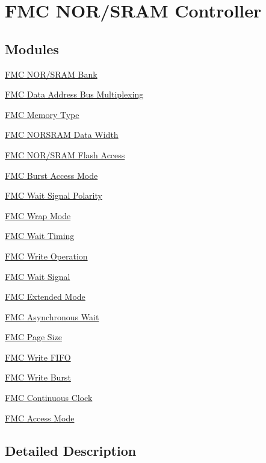 \hypertarget{group___f_m_c___l_l___n_o_r___s_r_a_m___controller}{}\section{F\+MC N\+O\+R/\+S\+R\+AM Controller}
\label{group___f_m_c___l_l___n_o_r___s_r_a_m___controller}
\subsection*{Modules}
\begin{DoxyCompactItemize}
\item 
\hyperlink{group___f_m_c___n_o_r_s_r_a_m___bank}{F\+M\+C N\+O\+R/\+S\+R\+A\+M Bank}
\item 
\hyperlink{group___f_m_c___data___address___bus___multiplexing}{F\+M\+C Data Address Bus Multiplexing}
\item 
\hyperlink{group___f_m_c___memory___type}{F\+M\+C Memory Type}
\item 
\hyperlink{group___f_m_c___n_o_r_s_r_a_m___data___width}{F\+M\+C N\+O\+R\+S\+R\+A\+M Data Width}
\item 
\hyperlink{group___f_m_c___n_o_r_s_r_a_m___flash___access}{F\+M\+C N\+O\+R/\+S\+R\+A\+M Flash Access}
\item 
\hyperlink{group___f_m_c___burst___access___mode}{F\+M\+C Burst Access Mode}
\item 
\hyperlink{group___f_m_c___wait___signal___polarity}{F\+M\+C Wait Signal Polarity}
\item 
\hyperlink{group___f_m_c___wrap___mode}{F\+M\+C Wrap Mode}
\item 
\hyperlink{group___f_m_c___wait___timing}{F\+M\+C Wait Timing}
\item 
\hyperlink{group___f_m_c___write___operation}{F\+M\+C Write Operation}
\item 
\hyperlink{group___f_m_c___wait___signal}{F\+M\+C Wait Signal}
\item 
\hyperlink{group___f_m_c___extended___mode}{F\+M\+C Extended Mode}
\item 
\hyperlink{group___f_m_c___asynchronous_wait}{F\+M\+C Asynchronous Wait}
\item 
\hyperlink{group___f_m_c___page___size}{F\+M\+C Page Size}
\item 
\hyperlink{group___f_m_c___write___f_i_f_o}{F\+M\+C Write F\+I\+FO}
\item 
\hyperlink{group___f_m_c___write___burst}{F\+M\+C Write Burst}
\item 
\hyperlink{group___f_m_c___continous___clock}{F\+M\+C Continuous Clock}
\item 
\hyperlink{group___f_m_c___access___mode}{F\+M\+C Access Mode}
\end{DoxyCompactItemize}


\subsection{Detailed Description}
